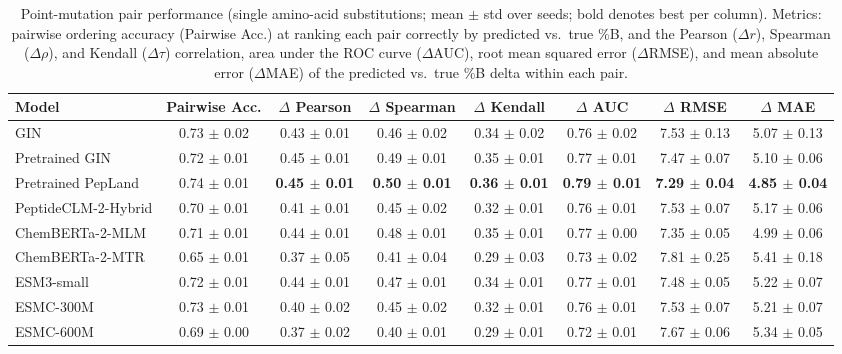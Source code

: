 \begin{table}[htbp]
  \caption{Point-mutation pair performance (single amino-acid substitutions; mean $\pm$ std over seeds; bold denotes best per column). Metrics: pairwise ordering accuracy (Pairwise Acc.) at ranking each pair correctly by predicted vs.\ true \%B, and the Pearson ($\Delta r$), Spearman ($\Delta\rho$), and Kendall ($\Delta\tau$) correlation, area under the ROC curve ($\Delta$AUC), root mean squared error ($\Delta$RMSE), and mean absolute error ($\Delta$MAE) of the predicted vs.\ true \%B delta within each pair.}
  \label{tab:point_mutation_performance}
  \centering
  \scriptsize
  \setlength{\tabcolsep}{6pt}
  \begin{tabular}{lccccccc}
    \toprule
    \textbf{Model} & \textbf{Pairwise Acc.} & \textbf{$\Delta$ Pearson} & \textbf{$\Delta$ Spearman} & \textbf{$\Delta$ Kendall} & \textbf{$\Delta$ AUC} & \textbf{$\Delta$ RMSE} & \textbf{$\Delta$ MAE} \\
    \midrule
    GIN & 0.73 $\pm$ 0.02 & 0.43 $\pm$ 0.01 & 0.46 $\pm$ 0.02 & 0.34 $\pm$ 0.02 & 0.76 $\pm$ 0.02 & 7.53 $\pm$ 0.13 & 5.07 $\pm$ 0.13 \\
    Pretrained GIN & 0.72 $\pm$ 0.01 & 0.45 $\pm$ 0.01 & 0.49 $\pm$ 0.01 & 0.35 $\pm$ 0.01 & 0.77 $\pm$ 0.01 & 7.47 $\pm$ 0.07 & 5.10 $\pm$ 0.06 \\
    Pretrained PepLand & 0.74 $\pm$ 0.01 & \textbf{0.45 $\pm$ 0.01} & \textbf{0.50 $\pm$ 0.01} & \textbf{0.36 $\pm$ 0.01} & \textbf{0.79 $\pm$ 0.01} & \textbf{7.29 $\pm$ 0.04} & \textbf{4.85 $\pm$ 0.04} \\
    PeptideCLM-2-Hybrid & 0.70 $\pm$ 0.01 & 0.41 $\pm$ 0.01 & 0.45 $\pm$ 0.02 & 0.32 $\pm$ 0.01 & 0.76 $\pm$ 0.01 & 7.53 $\pm$ 0.07 & 5.17 $\pm$ 0.06 \\
    ChemBERTa-2-MLM & 0.71 $\pm$ 0.01 & 0.44 $\pm$ 0.01 & 0.48 $\pm$ 0.01 & 0.35 $\pm$ 0.01 & 0.77 $\pm$ 0.00 & 7.35 $\pm$ 0.05 & 4.99 $\pm$ 0.06 \\
    ChemBERTa-2-MTR & 0.65 $\pm$ 0.01 & 0.37 $\pm$ 0.05 & 0.41 $\pm$ 0.04 & 0.29 $\pm$ 0.03 & 0.73 $\pm$ 0.02 & 7.81 $\pm$ 0.25 & 5.41 $\pm$ 0.18 \\
    ESM3-small & 0.72 $\pm$ 0.01 & 0.44 $\pm$ 0.01 & 0.47 $\pm$ 0.01 & 0.34 $\pm$ 0.01 & 0.77 $\pm$ 0.01 & 7.48 $\pm$ 0.05 & 5.22 $\pm$ 0.07 \\
    ESMC-300M & 0.73 $\pm$ 0.01 & 0.40 $\pm$ 0.02 & 0.45 $\pm$ 0.02 & 0.32 $\pm$ 0.01 & 0.76 $\pm$ 0.01 & 7.53 $\pm$ 0.07 & 5.21 $\pm$ 0.07 \\
    ESMC-600M & 0.69 $\pm$ 0.00 & 0.37 $\pm$ 0.02 & 0.40 $\pm$ 0.01 & 0.29 $\pm$ 0.01 & 0.72 $\pm$ 0.01 & 7.67 $\pm$ 0.06 & 5.34 $\pm$ 0.05 \\

\end{tabular}
\end{table}

